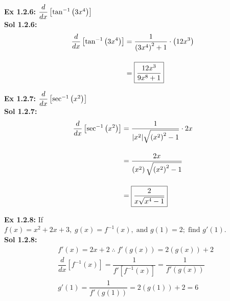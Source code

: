 \textbf{Ex 1.2.6: } $\dfrac{d}{dx} \left[\tan^{-1} \left(3x^4\right)\right]$ \\[11pt]
\textbf{Sol 1.2.6: } \begin{align*}
    \dfrac{d}{dx} \left[\tan^{-1} \left(3x^4\right)\right] & = \dfrac{1}{\left(3x^4\right)^2 + 1} \cdot \left(12x^3\right) \\[11pt]
    & = \boxed{\dfrac{12x^3}{9x^8 + 1}}
\end{align*}

\textbf{Ex 1.2.7: } $\dfrac{d}{dx} \left[\sec^{-1} \left(x^2\right)\right]$ \\[11pt]
\textbf{Sol 1.2.7: } \begin{align*}
    \dfrac{d}{dx} \left[\sec^{-1} \left(x^2\right)\right] & = \dfrac{1}{|x^2|\sqrt{\left(x^2\right)^2 - 1}} \cdot 2x \\[11pt]
    & = \dfrac{2x}{\left(x^2\right)\sqrt{\left(x^2\right)^2 - 1}} \\[11pt]
    & = \boxed{\dfrac{2}{x\sqrt{x^4 - 1}}}
\end{align*}

\begin{center}
\end{center}

\textbf{Ex 1.2.8: } If $f(x) = x^2 + 2x + 3, \; g(x) = f^{-1}(x), \; \text{and } g(1) = 2; \; \text{find } g'(1)$. \\[11pt]
\textbf{Sol 1.2.8: } \begin{align*}
    & f'(x) = 2x + 2 \; \therefore \; f'\left(g(x)\right) = 2\left(g(x)\right) + 2 \\[11pt]
    & \dfrac{d}{dx} \left[f^{-1}(x)\right] = \dfrac{1}{f'\left[f^{-1}(x)\right]} = \dfrac{1}{f'\left(g(x)\right)} \\[11pt]
    & g'(1) = \dfrac{1}{f'\left(g(1)\right)} = 2\left(g(1)\right) + 2 = \boxed{6}
\end{align*}

